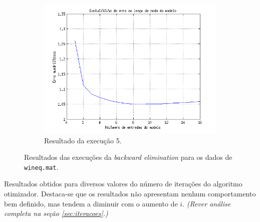 \begin{figure}[H]
			\begin{subfigure}{.5\textwidth}
				  \centering
				  \includegraphics[width=1\linewidth]{image/backward5_2}
				  \caption{Resultado da execução 5.}
				  \label{backward5_2}
				\end{subfigure}	
			
			\caption{Resultados das execuções da \textit{backward elimination} para os
			dados de \texttt{wineq.mat}.}
			\label{fig:back2}
			\end{figure}
			
		\FloatBarrier
				
		
		
\newpage

Resultados obtidos para diversos valores do número de iterações do algoritmo
otimizador. Destaca-se que os resultados não apresentam nenhum comportamento bem
definido, mas tendem a diminuir com o aumento de \(i\). \textit{(Rever análise
completa na seção
\ref{sec:iteracoes}.)}
		
